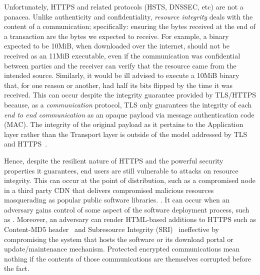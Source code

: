   Unfortunately, HTTPS and related protocols (HSTS,
DNSSEC, etc) are not a panacea. Unlike authenticity and
confidentiality, \textit{resource integrity} deals with the content of
a communication; specifically: ensuring the bytes received at the end
of a transaction are the bytes we expected to receive. For example, a
binary expected to be 10MiB, when downloaded over the internet, should
not be received as an 11MiB executable, even if the communication was
confidential between parties and the receiver can verify that the
resource came from the intended source. Similarly, it would be ill
advised to execute a 10MiB binary that, for one reason or another, had
half its bits flipped by the time it was received. This can occur
despite the integrity guarantee provided by TLS/HTTPS because, as a
\textit{communication} protocol, TLS only guarantees the integrity of
each \textit{end to end communication} as an opaque payload via
message authentication code (MAC). The integrity of the original
payload as it pertains to the Application layer rather than the
Transport layer is outside of the model addressed by TLS and
HTTPS~\cite{TLS1.2, HTTPS}.  

Hence, despite the resilient nature of HTTPS and the powerful security
properties it guarantees, end users are still vulnerable to attacks on resource
integrity. This can occur at the point of distribution, such as a compromised
node in a third party CDN that delivers compromised malicious resources
masquerading as popular public software libraries. . It can occur when an adversary gains control of some
aspect of the software deployment process, such as . Moreover, an adversary can render HTML-based additions to HTTPS
such as Content-MD5 header~\cite{MD5Header} and Subresource Integrity
(SRI)~\cite{SRI} ineffective by compromising the system that hosts the software
or its download portal or update/maintenance mechanism. Protected encrypted
communications mean nothing if the contents of those communications are
themselves corrupted before the fact.

